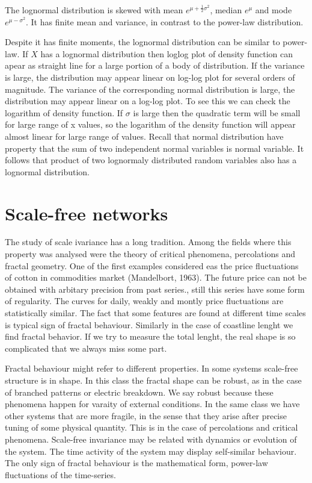 The lognormal distribution is skewed with mean $e^{\mu + \frac{1}{2}\sigma^2}$, median $e^\mu$ and mode $e^{\mu - \sigma^2 }$. It has finite mean and variance, in contrast to the power-law distribution.  

Despite it has finite moments, the lognormal distribution can be similar to power-law. If $X$ has a lognormal distribution then loglog plot of density function can apear as straight line for a large portion of a body of distribution. If the variance is large, the distribution may appear linear on log-log plot for several orders of magnitude. The variance of the corresponding normal distribution is large, the distribution may appear linear on a log-log plot. To see this we can check the logarithm of density function. 
If $\sigma$ is large then the quadratic term will be small for large range of x values, so the logarithm of the density function will appear almost linear for large range of values. 
Recall that normal distribution have property that the sum of two independent normal variables is normal variable. It follows that product of two lognormaly distributed random variables also has a lognormal distribution. 

\section{Scale-free networks}

The study of scale ivariance has a long tradition. Among the fields where this property was analysed were the theory of critical phenomena, percolations and fractal geometry. One of the first examples considered eas the price fluctuations  of cotton in commodities market (Mandelbort, 1963). The future price can not be obtained with arbitary precision from past series., still this series have some form of regularity. The curves for daily, weakly and montly price fluctuations are statistically similar. The fact that some features are found at different time scales is typical sign of fractal behaviour. Similarly in the case of coastline lenght we find fractal behavior. If we try to measure the total lenght, the real shape is so complicated that we always miss some part. 

Fractal behaviour might refer to different properties. In some systems scale-free structure is in shape. In this class the fractal shape can be robust, as in the case of branched patterns or electric breakdown. We say robust because these phenomena happen for varaity of external conditions. In the same class we have other systems that are more fragile, in the sense that they arise after precise tuning of some physical quantity. This is in the case of percolations and critical phenomena. Scale-free invariance may be related with dynamics or evolution of the system. The time activity of the system may display self-similar behaviour. The only sign of fractal behaviour is the mathematical form, power-law fluctuations of the time-series. 

